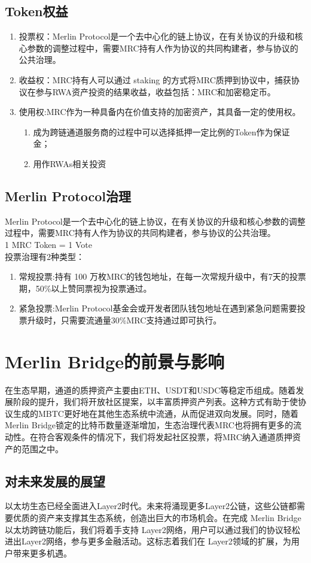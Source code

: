 \documentclass{article}
\begin{document}
\subsection{Token权益}
\begin{enumerate}
    \item 投票权：Merlin Protocol是一个去中心化的链上协议，在有关协议的升级和核心参数的调整过程中，需要MRC持有人作为协议的共同构建者，参与协议的公共治理。
    \item 收益权：MRC持有人可以通过 staking 的方式将MRC质押到协议中，捕获协议在参与RWA资产投资的结果收益，收益包括：MRC和加密稳定币。
    \item 使用权:MRC作为一种具备内在价值支持的加密资产，其具备一定的使用权。
    \begin{enumerate}
        \item 成为跨链通道服务商的过程中可以选择抵押一定比例的Token作为保证金；
        \item 用作RWAs相关投资
    \end{enumerate}
\end{enumerate}
\subsection{Merlin Protocol治理}
Merlin Protocol是一个去中心化的链上协议，在有关协议的升级和核心参数的调整过程中，需要MRC持有人作为协议的共同构建者，参与协议的公共治理。\\
1 MRC Token =  1 Vote \\
投票治理有2种类型：\\
\begin{enumerate}
    \item 常规投票:持有 100 万枚MRC的钱包地址，在每一次常规升级中，有7天的投票期，50\%以上赞同票视为投票通过。
    \item 紧急投票:Merlin Protocol基金会或开发者团队钱包地址在遇到紧急问题需要投票升级时，只需要流通量30\%MRC支持通过即可执行。
\end{enumerate}
\section{Merlin Bridge的前景与影响}
\par 在生态早期，通道的质押资产主要由ETH、USDT和USDC等稳定币组成。随着发展阶段的提升，我们将开放社区提案，以丰富质押资产列表。这种方式有助于使协议生成的MBTC更好地在其他生态系统中流通，从而促进双向发展。同时，随着Merlin Bridge锁定的比特币数量逐渐增加，生态治理代表MRC也将拥有更多的流动性。在符合客观条件的情况下，我们将发起社区投票，将MRC纳入通道质押资产的范围之中。
\subsection{对未来发展的展望}
以太坊生态已经全面进入Layer2时代。未来将涌现更多Layer2公链，这些公链都需要优质的资产来支撑其生态系统，创造出巨大的市场机会。在完成 Merlin Bridge以太坊跨链功能后，我们将着手支持 Layer2网络，用户可以通过我们的协议轻松进出Layer2网络，参与更多金融活动。这标志着我们在 Layer2领域的扩展，为用户带来更多机遇。



\end{document}
